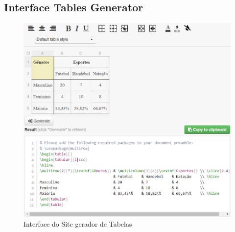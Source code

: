 \begin{appendices}
    \section{Interface Tables Generator}

    \begin{figure}[htb]
        \centering
        \includegraphics[width=\textwidth]{images/tables_generator_interface.png}
        \caption{Interface do Site gerador de Tabelas}
        \label{fig:interface}
    \end{figure}
\end{appendices}